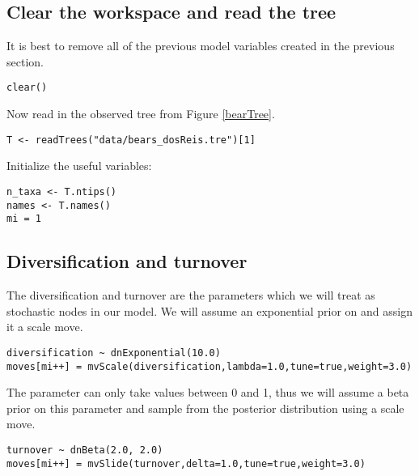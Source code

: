 \subsection{Clear the workspace and read the tree}

It is best to remove all of the previous model variables created in the previous section.
{\tt \begin{snugshade*}
\begin{lstlisting}
clear()
\end{lstlisting}
\end{snugshade*}}

Now read in the observed tree from Figure \ref{bearTree}. 
{\tt \begin{snugshade*}
\begin{lstlisting}
T <- readTrees("data/bears_dosReis.tre")[1]
\end{lstlisting}
\end{snugshade*}}

Initialize the useful variables:
{\tt \begin{snugshade*}
\begin{lstlisting}
n_taxa <- T.ntips()
names <- T.names()
mi = 1 
\end{lstlisting}
\end{snugshade*}}

\subsection{Diversification and turnover}

The diversification and turnover are the parameters which we will treat as stochastic nodes in our model. 
We will assume an exponential prior on  and assign it a scale move.
{\tt \begin{snugshade*}
\begin{lstlisting}
diversification ~ dnExponential(10.0) 
moves[mi++] = mvScale(diversification,lambda=1.0,tune=true,weight=3.0) 
\end{lstlisting}
\end{snugshade*}}

The  parameter can only take values between 0 and 1, thus we will assume a beta prior on this parameter and sample from the posterior distribution using a scale move.
{\tt \begin{snugshade*}
\begin{lstlisting}
turnover ~ dnBeta(2.0, 2.0) 
moves[mi++] = mvSlide(turnover,delta=1.0,tune=true,weight=3.0)
\end{lstlisting}
\end{snugshade*}}

